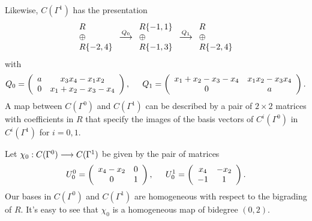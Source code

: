 \documentclass[12pt]{article}
\begin{document}
Likewise,  $C(\Gamma^1)$ has the presentation 
\begin{equation*}
  \begin{array}{l}R \\ \oplus \\ R\{-2,4\}\end{array}
  \stackrel{Q_0}{\longrightarrow}
  \begin{array}{l} R\{-1,1\} \\ \oplus \\ R\{-1,3\}  \end{array}
  \stackrel{Q_1}{\longrightarrow} 
  \begin{array}{l}R \\ \oplus \\ R\{-2,4\}\end{array}
\end{equation*}
with 
\begin{equation*}
Q_0=\left(\begin{array}{cc} a  & x_3x_4-x_1x_2 \\
      0   & x_1+x_2-x_3-x_4 \end{array} \right), \hspace{0.2in}
Q_1=\left(\begin{array}{cc} x_1+x_2-x_3-x_4  & x_1x_2-x_3x_4 \\
      0  & a \end{array} \right). 
\end{equation*}
A map between $C(\Gamma^0)$ and $C(\Gamma^1)$ can be 
described by a pair of $2\times 2$ matrices with coefficients in $R$ 
that specify the images of the basis vectors of $C^i(\Gamma^0)$ 
in $C^i(\Gamma^1)$ for $i=0,1.$ 

Let  $\chi_0: C(\Gamma^0) \longrightarrow C(\Gamma^1)$ be 
given by the pair of matrices 
\begin{equation}\label{chinull} 
U_0^0=\left(\begin{array}{cc} x_4-x_2  &  0  \\
      0   &  1  \end{array} \right), \hspace{0.2in}
U_0^1=\left(\begin{array}{cc} x_4  &  -x_2 \\
      -1  & 1 \end{array} \right). 
\end{equation}
Our bases in $C(\Gamma^0)$ and $C(\Gamma^1)$ are homogeneous 
with respect to the bigrading of $R.$ It's easy to see that $\chi_0$ is 
a homogeneous map of bidegree $(0,2).$ 
\end{document}
